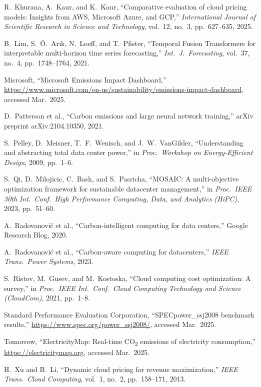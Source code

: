 \documentclass[12pt]{article}
\begin{document}
\begin{thebibliography}{}
 R.~Khurana, A.~Kaur, and K.~Kaur, ``Comparative evaluation of cloud pricing models: Insights from AWS, Microsoft Azure, and GCP,'' \textit{International Journal of Scientific Research in Science and Technology}, vol.\ 12, no.\ 3, pp.\ 627--635, 2025.

 B.~Lim, S.~\"{O}.~Ar{\i}k, N.~Loeff, and T.~Pfister, ``Temporal Fusion Transformers for interpretable multi-horizon time series forecasting,'' \textit{Int.\ J.\ Forecasting}, vol.\ 37, no.\ 4, pp.\ 1748--1764, 2021.

 Microsoft, ``Microsoft Emissions Impact Dashboard,'' \url{https://www.microsoft.com/en-us/sustainability/emissions-impact-dashboard}, accessed Mar.\ 2025.

 D.~Patterson et al., ``Carbon emissions and large neural network training,'' arXiv preprint arXiv:2104.10350, 2021.

 S.~Pelley, D.~Meisner, T.~F.~Wenisch, and J.~W.~VanGilder, ``Understanding and abstracting total data center power,'' in \textit{Proc.\ Workshop on Energy-Efficient Design}, 2009, pp.\ 1--6.

 S.~Qi, D.~Milojicic, C.~Bash, and S.~Pasricha, ``MOSAIC: A multi-objective optimization framework for sustainable datacenter management,'' in \textit{Proc.\ IEEE 30th Int.\ Conf.\ High Performance Computing, Data, and Analytics (HiPC)}, 2023, pp.\ 51--60.

 A.~Radovanovi\'{c} et al., ``Carbon-intelligent computing for data centers,'' Google Research Blog, 2020.

 A.~Radovanovi\'{c} et al., ``Carbon-aware computing for datacenters,'' \textit{IEEE Trans.\ Power Systems}, 2023.

 S.~Ristov, M.~Gusev, and M.~Kostoska, ``Cloud computing cost optimization: A survey,'' in \textit{Proc.\ IEEE Int.\ Conf.\ Cloud Computing Technology and Science (CloudCom)}, 2021, pp.\ 1--8.

 Standard Performance Evaluation Corporation, ``SPECpower\_ssj2008 benchmark results,'' \url{https://www.spec.org/power_ssj2008/}, accessed Mar.\ 2025.

 Tomorrow, ``ElectricityMap: Real-time CO\textsubscript{2} emissions of electricity consumption,'' \url{https://electricitymap.org}, accessed Mar.\ 2025.

 H.~Xu and B.~Li, ``Dynamic cloud pricing for revenue maximization,'' \textit{IEEE Trans.\ Cloud Computing}, vol.\ 1, no.\ 2, pp.\ 158--171, 2013.

\end{thebibliography}
\end{document}
